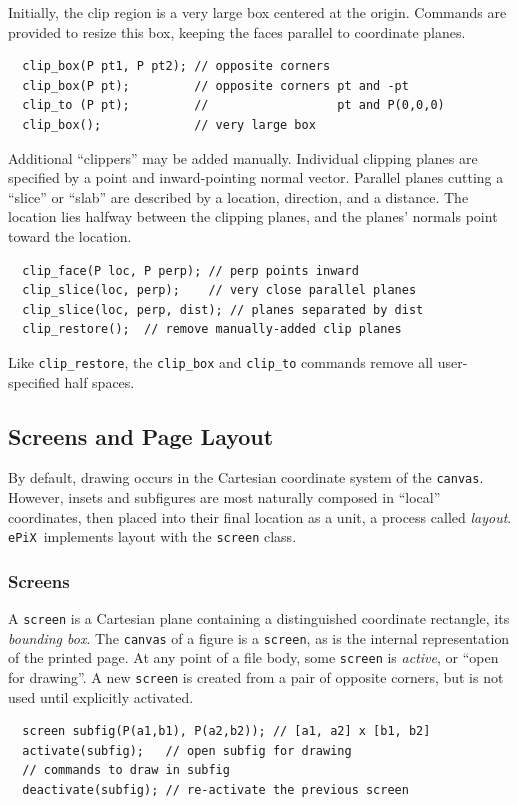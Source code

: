 \documentclass[12pt,letterpaper]{book}
\newcommand{\code}[1]{\texttt{#1}}
\newcommand{\ePiX}{\code{ePiX}}
\newcommand{\findex}[1]{\ignorespaces}
\begin{document}
Initially, the clip region is a very large box centered at the
origin. Commands are provided to resize this box, keeping the faces
parallel to coordinate planes.
\findex{clip\_box}
\findex{clip\_to}
\begin{verbatim}
  clip_box(P pt1, P pt2); // opposite corners
  clip_box(P pt);         // opposite corners pt and -pt
  clip_to (P pt);         //                  pt and P(0,0,0)
  clip_box();             // very large box
\end{verbatim}
Additional ``clippers'' may be added manually. Individual clipping
planes are specified by a point and inward-pointing normal vector.
Parallel planes cutting a ``slice'' or ``slab'' are described by a
location, direction, and a distance. The location lies halfway between
the clipping planes, and the planes' normals point toward the location.
\findex{clip\_face}
\findex{clip\_slice}
\findex{clip\_restore}
\begin{verbatim}
  clip_face(P loc, P perp); // perp points inward
  clip_slice(loc, perp);    // very close parallel planes
  clip_slice(loc, perp, dist); // planes separated by dist
  clip_restore();  // remove manually-added clip planes
\end{verbatim}
Like \code{clip\_restore}, the \code{clip\_box} and \code{clip\_to}
commands remove all user-specified half spaces. 


\subsection{Screens and Page Layout}

By default, drawing occurs in the Cartesian coordinate system of the
\code{canvas}. However, insets and subfigures are most naturally
composed in ``local'' coordinates, then placed into their final
location as a unit, a process called \emph{layout}. \ePiX\ implements
layout with the \code{screen} class.


\subsubsection*{Screens}

A \code{screen} is a Cartesian plane containing a distinguished
coordinate rectangle, its \emph{bounding box}. The \code{canvas} of a
figure is a \code{screen}, as is the internal representation of the
printed page.  At any point of a file body, some \code{screen} is
\emph{active}, or ``open for drawing''. A new \code{screen} is created
from a pair of opposite corners, but is not used until explicitly
activated. 
\findex{activate}
\findex{deactivate}
\begin{verbatim}
  screen subfig(P(a1,b1), P(a2,b2)); // [a1, a2] x [b1, b2]
  activate(subfig);   // open subfig for drawing
  // commands to draw in subfig
  deactivate(subfig); // re-activate the previous screen
\end{verbatim}
\end{document}
